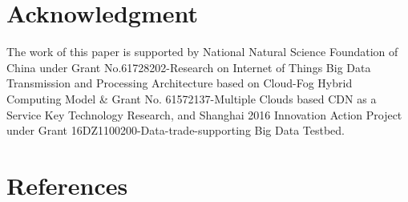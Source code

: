 \documentclass[5p]{elsarticle}
\begin{document}

\section{Acknowledgment}
The work of this paper is supported by National Natural Science Foundation of China under Grant No.61728202-Research on Internet of Things Big Data Transmission and Processing Architecture based on Cloud-Fog Hybrid Computing Model & Grant No. 61572137-Multiple Clouds based CDN as a Service Key Technology Research, and Shanghai 2016 Innovation Action Project under Grant 16DZ1100200-Data-trade-supporting Big Data Testbed.


\section*{References}


\end{document}
